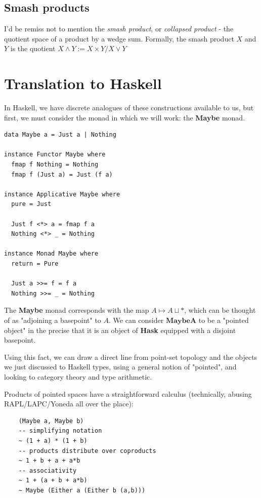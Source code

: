 \documentclass[tikz]{beamer}
\theoremstyle{definition}
\begin{document}
\subsection{Smash products}
\frame
{
	I'd be remiss not to mention the \textit{smash product}, or \textit{collapsed product} - the quotient space of a product by a wedge sum. Formally, the smash product $X$ and $Y$ is the quotient $X \wedge Y := X \times Y / X \vee Y$
}

\section{Translation to Haskell}

\frame 
{
	In Haskell, we have discrete analogues of these constructions available to us, but first, we must consider the monad in which we will work: the \textbf{Maybe} monad. 

}

\begin{frame}[fragile]
	
	\begin{center}
		\begin{verbatim}
data Maybe a = Just a | Nothing
			
instance Functor Maybe where
  fmap f Nothing = Nothing
  fmap f (Just a) = Just (f a)
			  
instance Applicative Maybe where
  pure = Just
		  
  Just f <*> a = fmap f a
  Nothing <*> _ = Nothing
			  
instance Monad Maybe where
  return = Pure
  
  Just a >>= f = f a
  Nothing >>= _ = Nothing
\end{verbatim}
\end{center}
\end{frame}

\frame
{
	The \textbf{Maybe} monad corresponds with the map $A \mapsto  A \sqcup *$, which can be thought of as "adjoining a basepoint" to $A$. We can consider $\mathbf{Maybe A}$ to be a "pointed object" in the precise that it is an object of \textbf{Hask} equipped with a disjoint basepoint. 
}

\frame
{
 	Using this fact, we can draw a direct line from point-set topology and the objects we just discussed to Haskell types, using a general notion of "pointed", and looking to category theory and type arithmetic. 
}


\begin{frame}[fragile]
	Products of pointed spaces have a straightforward calculus (technically, abusing RAPL/LAPC/Yoneda all over the place):  
	
	\begin{verbatim}
	(Maybe a, Maybe b)
	-- simplifying notation
	~ (1 + a) * (1 + b)
	-- products distribute over coproducts
	~ 1 + b + a + a*b
	-- associativity
	~ 1 + (a + b + a*b)
	~ Maybe (Either a (Either b (a,b)))
	\end{verbatim}
\end{frame}
\end{document}
